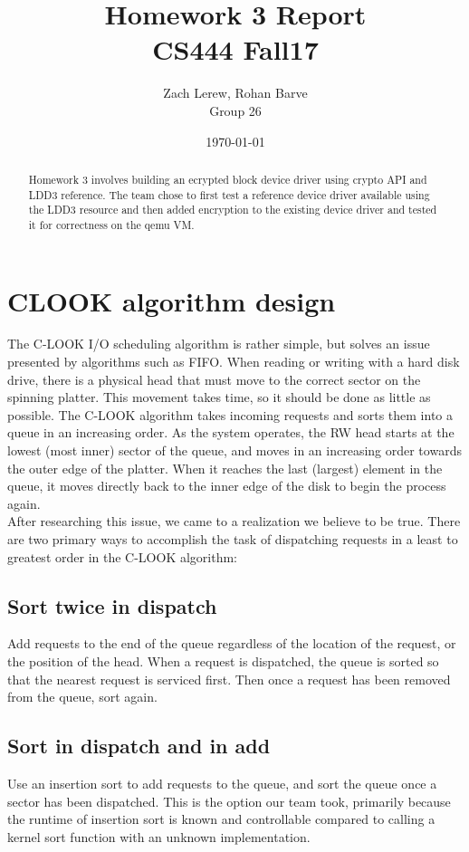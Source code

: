 \documentclass[letterpaper,10pt,fleqn]{article}
\title{Homework 3 Report\\\large CS444 Fall17}
\author{Zach Lerew, Rohan Barve\\\large Group 26}
\date{\today}
\begin{document}
	\begin{titlingpage}
		\maketitle
		\begin{abstract}
			\noindent Homework 3 involves building an ecrypted block device driver using crypto  API and LDD3 reference. The team chose to first test a reference device driver available using the LDD3 resource and then added encryption to the existing device driver and tested it for correctness on the qemu VM. 
		
		\end{abstract}
	\end{titlingpage}


	\section*{CLOOK algorithm design}
	The C-LOOK I/O scheduling algorithm is rather simple, but solves an issue presented by algorithms such as FIFO. When reading or writing with a hard disk drive, there is a physical head that must move to the correct sector on the spinning platter.
	This movement takes time, so it should be done as little as possible. The C-LOOK algorithm takes incoming requests and sorts them into a queue in an increasing order.
	As the system operates, the RW head starts at the lowest (most inner) sector of the queue, and moves in an increasing order towards the outer edge of the platter.
	When it reaches the last (largest) element in the queue, it moves directly back to the inner edge of the disk to begin the process again.
	\\After researching this issue, we came to a realization we believe to be true. There are two primary ways to accomplish the task of dispatching requests in a least to greatest order in the C-LOOK algorithm:
	\subsection{Sort twice in dispatch}
	Add requests to the end of the queue regardless of the location of the request, or the position of the head. When a request is dispatched, the queue is sorted so that the nearest request is serviced first. Then once a request has been removed from the queue, sort again.
	\subsection{Sort in dispatch and in add}
	Use an insertion sort to add requests to the queue, and sort the queue once a sector has been dispatched.
	This is the option our team took, primarily because the runtime of insertion sort is known and controllable compared to calling a kernel sort function with an unknown implementation.
\end{document}
